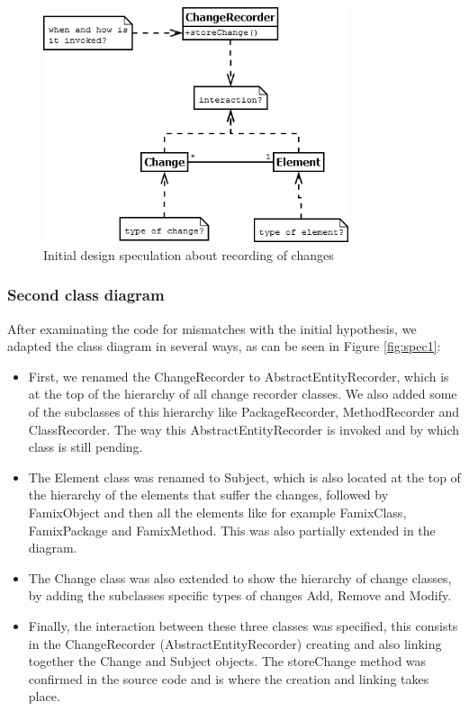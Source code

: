 \documentclass{article}
\begin{document}
\begin{figure}[h]
\centering
\includegraphics[width=0.8\textwidth]{Images/spec0}
\caption{Initial design speculation about recording of changes}
\label{fig:skim}
\end{figure}

\subsubsection{Second class diagram}
After examinating the code for mismatches with the initial hypothesis, we adapted the class diagram in several ways, as can be seen in Figure \ref{fig:spec1}:

\begin{itemize}
\item First, we renamed the ChangeRecorder to AbstractEntityRecorder, which is at the top of the hierarchy of all change recorder classes. We also added some of the subclasses of this hierarchy like PackageRecorder, MethodRecorder and ClassRecorder. The way this AbstractEntityRecorder is invoked and by which class is still pending.

\item The Element class was renamed to Subject, which is also located at the top of the hierarchy of the elements that suffer the changes, followed by FamixObject and then all the elements like for example FamixClass, FamixPackage and FamixMethod. This was also partially extended in the diagram.

\item The Change class was also extended to show the hierarchy of change classes, by adding the subclasses specific types of changes Add, Remove and Modify.

\item Finally, the interaction between these three classes was specified, this consists in the ChangeRecorder (AbstractEntityRecorder) creating and also linking together the Change and Subject objects. The storeChange method was confirmed in the source code and is where the creation and linking takes place.
\end{itemize}
\end{document}
